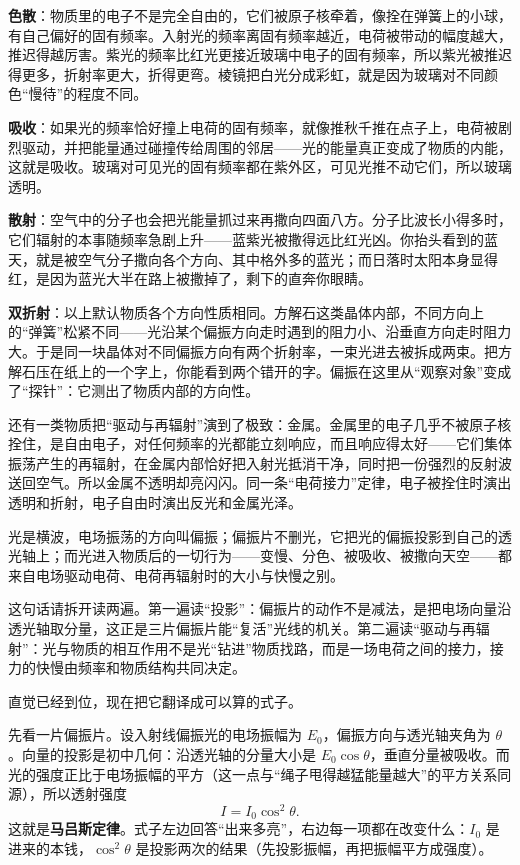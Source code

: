 \textbf{色散}：物质里的电子不是完全自由的，它们被原子核牵着，像拴在弹簧上的小球，有自己偏好的固有频率。入射光的频率离固有频率越近，电荷被带动的幅度越大，推迟得越厉害。紫光的频率比红光更接近玻璃中电子的固有频率，所以紫光被推迟得更多，折射率更大，折得更弯。棱镜把白光分成彩虹，就是因为玻璃对不同颜色“慢待”的程度不同。

\textbf{吸收}：如果光的频率恰好撞上电荷的固有频率，就像推秋千推在点子上，电荷被剧烈驱动，并把能量通过碰撞传给周围的邻居——光的能量真正变成了物质的内能，这就是吸收。玻璃对可见光的固有频率都在紫外区，可见光推不动它们，所以玻璃透明。

\textbf{散射}：空气中的分子也会把光能量抓过来再撒向四面八方。分子比波长小得多时，它们辐射的本事随频率急剧上升——蓝紫光被撒得远比红光凶。你抬头看到的蓝天，就是被空气分子撒向各个方向、其中格外多的蓝光；而日落时太阳本身显得红，是因为蓝光大半在路上被撒掉了，剩下的直奔你眼睛。

\textbf{双折射}：以上默认物质各个方向性质相同。方解石这类晶体内部，不同方向上的“弹簧”松紧不同——光沿某个偏振方向走时遇到的阻力小、沿垂直方向走时阻力大。于是同一块晶体对不同偏振方向有两个折射率，一束光进去被拆成两束。把方解石压在纸上的一个字上，你能看到两个错开的字。偏振在这里从“观察对象”变成了“探针”：它测出了物质内部的方向性。

还有一类物质把“驱动与再辐射”演到了极致：金属。金属里的电子几乎不被原子核拴住，是自由电子，对任何频率的光都能立刻响应，而且响应得太好——它们集体振荡产生的再辐射，在金属内部恰好把入射光抵消干净，同时把一份强烈的反射波送回空气。所以金属不透明却亮闪闪。同一条“电荷接力”定律，电子被拴住时演出透明和折射，电子自由时演出反光和金属光泽。


\begin{oneline}
光是横波，电场振荡的方向叫偏振；偏振片不删光，它把光的偏振投影到自己的透光轴上；而光进入物质后的一切行为——变慢、分色、被吸收、被撒向天空——都来自电场驱动电荷、电荷再辐射时的大小与快慢之别。
\end{oneline}

这句话请拆开读两遍。第一遍读“投影”：偏振片的动作不是减法，是把电场向量沿透光轴取分量，这正是三片偏振片能“复活”光线的机关。第二遍读“驱动与再辐射”：光与物质的相互作用不是光“钻进”物质找路，而是一场电荷之间的接力，接力的快慢由频率和物质结构共同决定。


直觉已经到位，现在把它翻译成可以算的式子。

先看一片偏振片。设入射线偏振光的电场振幅为 \(E_0\)，偏振方向与透光轴夹角为 \(\theta\)。向量的投影是初中几何：沿透光轴的分量大小是 \(E_0\cos\theta\)，垂直分量被吸收。而光的强度正比于电场振幅的平方（这一点与“绳子甩得越猛能量越大”的平方关系同源），所以透射强度
\[
  I = I_0 \cos^2\theta .
\]
这就是\textbf{马吕斯定律}。式子左边回答“出来多亮”，右边每一项都在改变什么：\(I_0\) 是进来的本钱，\(\cos^2\theta\) 是投影两次的结果（先投影振幅，再把振幅平方成强度）。

